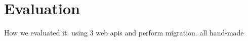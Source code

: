 \section{Evaluation}
\label{sec:Evaluation}

How we evaluated it. using 3 web apis and perform migration. all hand-made